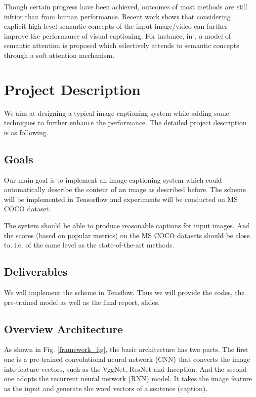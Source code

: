 \documentclass[conference]{IEEEtran}
\begin{document}
Though certain progress have been achieved, outcomes of most methods are still infrior than from human performance. Recent work shows that considering explicit high-level semantic concepts of the input image/video can further improve the performance of visual captioning. For instance, in \cite{you2016image}, a model of semantic attention is proposed which selectively attends to semantic concepts through a soft attention mechanism.



\section{Project Description}
We aim at designing a typical image captioning system while adding some techniques to further enhance the performance. The detailed project description is as following.
\subsection{Goals}
Our main goal is to implement an image captioning system which could automatically describe the content of an image as described before. The scheme will be implemented in Tensorflow and experiments will be conducted on MS COCO dataset.

The syetem should be able to produce reasonable captions for input images. And the scores (based on popular metrics) on the MS COCO datasets should be close to, i.e. of the same level as the state-of-the-art methods.

\subsection{Deliverables}

We will implement the scheme in Tensflow. Thus we will provide the codes, the pre-trained model as well as the final report, slides.
\subsection{Overview Architecture}

As shown in Fig. \ref{framework_fig}, the basic architecture has two parts. The first one is a pre-trained convolutional neural network (CNN) that converts the image into feature vectors, such as the VggNet, ResNet and Inception. And the second one adopts the recurrent neural network (RNN) model. It takes the image feature as the input and generate the word vectors of a sentence (caption).
\end{document}
